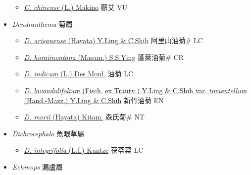 \begin{itemize}
  \begin{itemize}
        \item[] \href{http://www.theplantlist.org/tpl1.1/search?q=Crossostephium+chinense}{\textit{C. chinense} (L.) Makino}   蘄艾 VU
  \end{itemize}
 \item[] \textit{Dendranthema} 菊屬
                    
  \begin{itemize}
        \item[] \href{http://www.theplantlist.org/tpl1.1/search?q=Dendranthema+arisanense}{\textit{D. arisanense} (Hayata) Y.Ling \& C.Shih}   阿里山油菊\# LC
        \item[] \href{http://www.theplantlist.org/tpl1.1/search?q=Dendranthema+horaimontana}{\textit{D. horaimontana} (Masam.) S.S.Ying}   蓬萊油菊\# CR
        \item[] \href{http://www.theplantlist.org/tpl1.1/search?q=Dendranthema+indicum}{\textit{D. indicum} (L.) Des Moul.}   油菊 LC
        \item[] \href{http://www.theplantlist.org/tpl1.1/search?q=Dendranthema+lavandulifolium+var.+tomentellum}{\textit{D. lavandulifolium} (Fisch. ex Trautv.) Y.Ling \& C.Shih var. \textit{tomentellum} (Hand.-Mazz.) Y.Ling \& C.Shih}   新竹油菊 EN
        \item[] \href{http://www.theplantlist.org/tpl1.1/search?q=Dendranthema+morii}{\textit{D. morii} (Hayata) Kitam.}   森氏菊\# NT
  \end{itemize}
 \item[] \textit{Dichrocephala} 魚眼草屬
                    
  \begin{itemize}
        \item[] \href{http://www.theplantlist.org/tpl1.1/search?q=Dichrocephala+integrifolia}{\textit{D. integrifolia} (L.f.) Kuntze}   茯苓菜 LC
  \end{itemize}
 \item[] \textit{Echinops} 漏盧屬
                    

\end{itemize}
